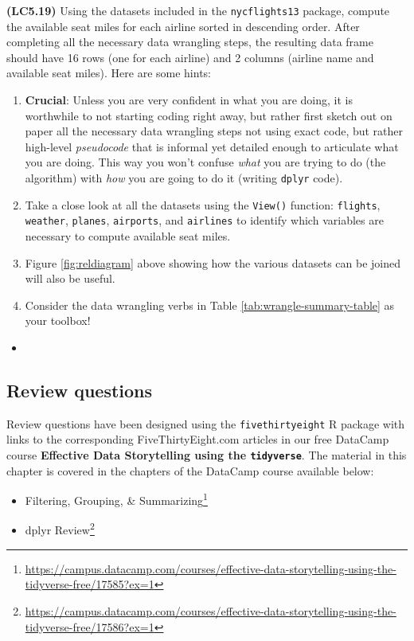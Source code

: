 \documentclass[12pt,]{krantz}
\providecommand{\tightlist}{%
  \setlength{\itemsep}{0pt}\setlength{\parskip}{0pt}}
\renewcommand{\href}[2]{#2\footnote{\url{#1}}}
\newenvironment{rmdblock}[1]
  {\begin{shaded*}
  \begin{itemize}
  \renewcommand{\labelitemi}{
    \raisebox{-.7\height}[0pt][0pt]{
    }
  }
  \item
  }
  {
  \end{itemize}
  \end{shaded*}
  }
\newenvironment{learncheck}
  {\begin{rmdblock}{warning}}
  {\end{rmdblock}}
\theoremstyle{definition}
\theoremstyle{definition}
\theoremstyle{definition}
\theoremstyle{remark}
\begin{document}
\textbf{(LC5.19)} Using the datasets included in the
\texttt{nycflights13} package, compute the available seat miles for each
airline sorted in descending order. After completing all the necessary
data wrangling steps, the resulting data frame should have 16 rows (one
for each airline) and 2 columns (airline name and available seat miles).
Here are some hints:

\begin{enumerate}
\def\labelenumi{\arabic{enumi}.}
\tightlist
\item
  \textbf{Crucial}: Unless you are very confident in what you are doing,
  it is worthwhile to not starting coding right away, but rather first
  sketch out on paper all the necessary data wrangling steps not using
  exact code, but rather high-level \emph{pseudocode} that is informal
  yet detailed enough to articulate what you are doing. This way you
  won't confuse \emph{what} you are trying to do (the algorithm) with
  \emph{how} you are going to do it (writing \texttt{dplyr} code).
\item
  Take a close look at all the datasets using the \texttt{View()}
  function: \texttt{flights}, \texttt{weather}, \texttt{planes},
  \texttt{airports}, and \texttt{airlines} to identify which variables
  are necessary to compute available seat miles.
\item
  Figure \ref{fig:reldiagram} above showing how the various datasets can
  be joined will also be useful.
\item
  Consider the data wrangling verbs in Table
  \ref{tab:wrangle-summary-table} as your toolbox!
\end{enumerate}

\begin{learncheck}

\end{learncheck}

\subsection{Review questions}\label{review-questions-2}

Review questions have been designed using the \texttt{fivethirtyeight} R
package \citep{R-fivethirtyeight} with links to the corresponding
FiveThirtyEight.com articles in our free DataCamp course
\textbf{Effective Data Storytelling using the \texttt{tidyverse}}. The
material in this chapter is covered in the chapters of the DataCamp
course available below:

\begin{itemize}
\tightlist
\item
  \href{https://campus.datacamp.com/courses/effective-data-storytelling-using-the-tidyverse-free/17585?ex=1}{Filtering,
  Grouping, \& Summarizing}
\item
  \href{https://campus.datacamp.com/courses/effective-data-storytelling-using-the-tidyverse-free/17586?ex=1}{dplyr
  Review}
\end{itemize}
\end{document}
